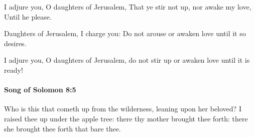 			\begin{versebox}
					\item[BHS] 
					\item[LXX] 
					\item[ASV] I adjure you, O daughters of Jerusalem, That ye stir not up, nor awake my love, Until he please.
					\item[NIV] Daughters of Jerusalem, I charge you: Do not arouse or awaken love until it so desires.
					\item[NRSV] I adjure you, O daughters of Jerusalem, do not stir up or awaken love until it is ready!
			\end{versebox}

		\paragraph{Song of Solomon 8:5} %
			\label{SONGOFSOLOMON-8-5}

			Who is this that cometh up from the wilderness, leaning upon her beloved? I raised thee up under the apple tree: there thy mother brought thee forth: there she brought thee forth that bare thee.

